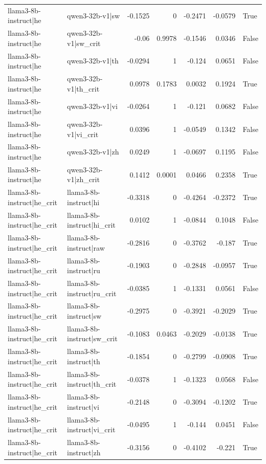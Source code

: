 \begin{table}
\begin{tabular}{l l r r r r l}
llama3-8b-instruct|he & qwen3-32b-v1|sw & -0.1525 & 0 & -0.2471 & -0.0579 & True \\
llama3-8b-instruct|he & qwen3-32b-v1|sw_crit & -0.06 & 0.9978 & -0.1546 & 0.0346 & False \\
llama3-8b-instruct|he & qwen3-32b-v1|th & -0.0294 & 1 & -0.124 & 0.0651 & False \\
llama3-8b-instruct|he & qwen3-32b-v1|th_crit & 0.0978 & 0.1783 & 0.0032 & 0.1924 & True \\
llama3-8b-instruct|he & qwen3-32b-v1|vi & -0.0264 & 1 & -0.121 & 0.0682 & False \\
llama3-8b-instruct|he & qwen3-32b-v1|vi_crit & 0.0396 & 1 & -0.0549 & 0.1342 & False \\
llama3-8b-instruct|he & qwen3-32b-v1|zh & 0.0249 & 1 & -0.0697 & 0.1195 & False \\
llama3-8b-instruct|he & qwen3-32b-v1|zh_crit & 0.1412 & 0.0001 & 0.0466 & 0.2358 & True \\
llama3-8b-instruct|he_crit & llama3-8b-instruct|hi & -0.3318 & 0 & -0.4264 & -0.2372 & True \\
llama3-8b-instruct|he_crit & llama3-8b-instruct|hi_crit & 0.0102 & 1 & -0.0844 & 0.1048 & False \\
llama3-8b-instruct|he_crit & llama3-8b-instruct|raw & -0.2816 & 0 & -0.3762 & -0.187 & True \\
llama3-8b-instruct|he_crit & llama3-8b-instruct|ru & -0.1903 & 0 & -0.2848 & -0.0957 & True \\
llama3-8b-instruct|he_crit & llama3-8b-instruct|ru_crit & -0.0385 & 1 & -0.1331 & 0.0561 & False \\
llama3-8b-instruct|he_crit & llama3-8b-instruct|sw & -0.2975 & 0 & -0.3921 & -0.2029 & True \\
llama3-8b-instruct|he_crit & llama3-8b-instruct|sw_crit & -0.1083 & 0.0463 & -0.2029 & -0.0138 & True \\
llama3-8b-instruct|he_crit & llama3-8b-instruct|th & -0.1854 & 0 & -0.2799 & -0.0908 & True \\
llama3-8b-instruct|he_crit & llama3-8b-instruct|th_crit & -0.0378 & 1 & -0.1323 & 0.0568 & False \\
llama3-8b-instruct|he_crit & llama3-8b-instruct|vi & -0.2148 & 0 & -0.3094 & -0.1202 & True \\
llama3-8b-instruct|he_crit & llama3-8b-instruct|vi_crit & -0.0495 & 1 & -0.144 & 0.0451 & False \\
llama3-8b-instruct|he_crit & llama3-8b-instruct|zh & -0.3156 & 0 & -0.4102 & -0.221 & True \\

\end{tabular}
\end{table}
